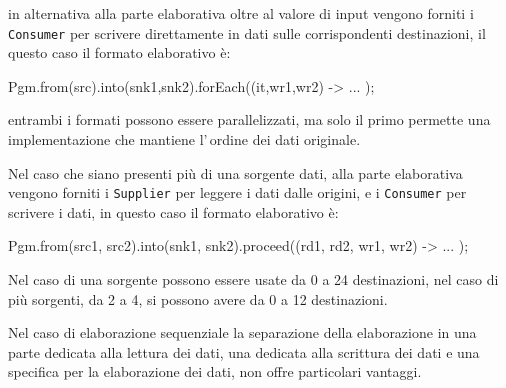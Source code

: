 in alternativa alla parte elaborativa oltre al valore di input vengono forniti i
\texttt{Consumer} per scrivere direttamente in dati sulle corrispondenti
destinazioni, il questo caso il formato elaborativo è:
\begin{elisting}[!htb]
\begin{javacode}
    Pgm.from(src).into(snk1,snk2).forEach((it,wr1,wr2) -> { ... });
\end{javacode}
\caption{elaborazione writer}
\label{lst:processWriter}
\end{elisting}
entrambi i formati possono essere parallelizzati, ma solo il primo permette una
implementazione che mantiene l'\,ordine dei dati originale.

Nel caso che siano presenti più di una sorgente dati, alla parte elaborativa
vengono forniti i \texttt{Supplier} per leggere i dati dalle origini, e i
\texttt{Consumer} per scrivere i dati, in questo caso il formato elaborativo è:
\begin{elisting}[!htb]
\begin{javacode}
    Pgm.from(src1, src2).into(snk1, snk2).proceed((rd1, rd2, wr1, wr2) -> { ... });
\end{javacode}
\caption{elaborazione reader-writer}
\label{lst:pullProcess}
\end{elisting}


Nel caso di una sorgente possono essere usate da 0 a 24 destinazioni,
nel caso di più sorgenti, da 2 a 4, si possono avere da 0 a 12 destinazioni.

Nel caso di elaborazione sequenziale la separazione della elaborazione in una
parte dedicata alla lettura dei dati, una dedicata alla scrittura dei dati e una
specifica per la elaborazione dei dati, non offre particolari vantaggi.

